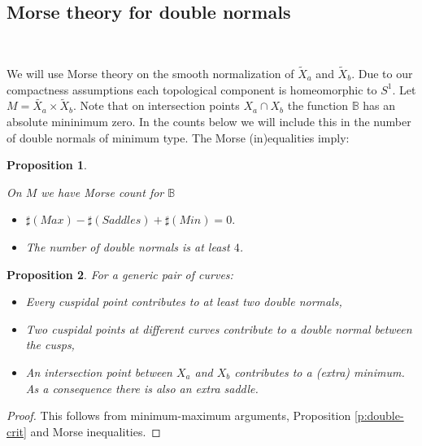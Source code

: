 \documentclass[12pt,a4,twoside]{amsart}
\newtheorem{prop}{Proposition}
\newtheorem*{main lemma}{The main lemma}
\begin{document}
\subsection{Morse theory for double normals}\

We will use Morse theory on the smooth normalization of $\tilde{X}_a$ and $\tilde{X}_b$. Due to our compactness assumptions  each topological component is homeomorphic to $S^1$. Let $M= \tilde{X_a} \times \tilde{X}_b$. Note that on intersection points $X_a \cap X_b$ the function $\mathbb{B}$ has an absolute mininimum zero. In the counts below we will include this in the number of double normals of minimum type. The Morse (in)equalities imply:

\begin{prop}\label{p:double2-count}

 On $M$
   we have Morse count for $\mathbb{B}$
   \begin{itemize}
   \item
  $\sharp(Max)-\sharp(Saddles) +\sharp(Min)  =0.$
 \item 
    The number of double normals is at least $ 4$.
    \end{itemize}
\end{prop}

\begin{prop}\label{p:extra-double}
For  a generic pair of curves:
\begin{itemize}
\item Every   cuspidal point  contributes to at least two double normals,
\item Two cuspidal points at different curves contribute to a double normal between the cusps,
\item An intersection point between $X_a$ and $X_b$ contributes to a (extra) minimum. As a consequence there is also an extra saddle.
\end{itemize}
\end{prop}
\begin{proof}
This follows from minimum-maximum arguments, Proposition \ref{p:double-crit} and Morse inequalities.

\end{proof}
\end{document}
